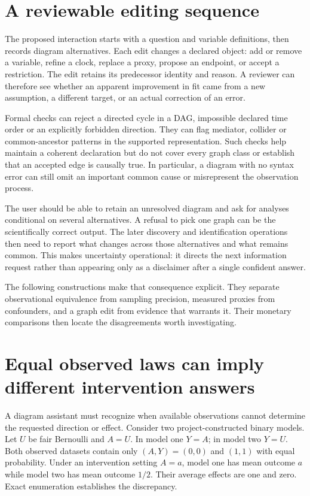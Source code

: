 \section{A reviewable editing sequence}

The proposed interaction starts with a question and variable definitions,
then records diagram alternatives. Each edit changes a declared object:
add or remove a variable, refine a clock, replace a proxy, propose an endpoint,
or accept a restriction. The edit retains its predecessor identity and
reason. A reviewer can therefore see whether an apparent improvement in
fit came from a new assumption, a different target, or an actual correction
of an error.

Formal checks can reject a directed cycle in a DAG, impossible declared
time order or an explicitly forbidden direction. They can flag mediator,
collider or common-ancestor patterns in the supported representation. Such
checks help maintain a coherent declaration but do not cover every graph
class or establish that an accepted edge is causally true. In particular,
a diagram with no syntax error can still omit an important common cause or
misrepresent the observation process.

The user should be able to retain an unresolved diagram and ask for analyses
conditional on several alternatives. A refusal to pick one graph can be the
scientifically correct output. The later discovery and identification
operations then need to report what changes across those alternatives and
what remains common. This makes uncertainty operational: it directs the
next information request rather than appearing only as a disclaimer after
a single confident answer.

The following constructions make that consequence explicit. They separate
observational equivalence from sampling precision, measured proxies from
confounders, and a graph edit from evidence that warrants it. Their monetary
comparisons then locate the disagreements worth investigating.


\section{Equal observed laws can imply different intervention answers}
\label{v13:la-equivalence}

A diagram assistant must recognize when available observations cannot determine
the requested direction or effect. Consider two project-constructed binary
models. Let $U$ be fair Bernoulli and $A=U$. In model one $Y=A$; in model two
$Y=U$. Both observed datasets contain only $(A,Y)=(0,0)$ and $(1,1)$ with equal
probability. Under an intervention setting $A=a$, model one has mean outcome
$a$ while model two has mean outcome $1/2$. Their average effects are one and
zero. Exact enumeration establishes the discrepancy. \citep{v13_project_exact}

